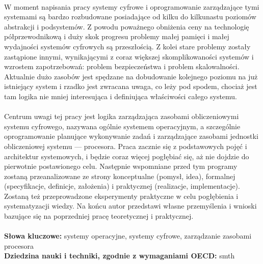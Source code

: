 \documentclass[../main]{subfiles}
\begin{document}
\paragraph{}
W moment napisania  pracy systemy cyfrowe i oprogramowanie zarządzające tymi
systemami są bardzo rozbudowane posiadające od kilku do kilkunastu poziomów abstrakcji i podsystemów. Z
powodu poważnego obniżenia ceny na technologię półprzewodnikową i duży skok progresu problemy małej
pamięci i małej wydajności systemów cyfrowych są przeszłością. Z kolei stare problemy zostały
zastąpione innymi, wynikającymi z coraz większej skomplikowaności systemów i wzrostem zapotrzebowań:
problem bezpieczeństwa i problem skalowalności. Aktualnie dużo zasobów jest spędzane na dobudowanie
kolejnego poziomu na już istniejący system i rzadko jest zwracana uwaga, co leży pod spodem, chociaż
jest tam logika nie mniej interesująca i definiująca właściwości całego systemu.

\paragraph{}
Centrum uwagi  tej pracy jest logika zarządzająca zasobami obliczeniowymi systemu
cyfrowego, nazywana ogólnie systemem operacyjnym, a szczególnie oprogramowanie planujące wykonywanie zadań
i zarządzające zasobami jednostki obliczeniowej systemu — procesora. Praca zacznie się z podstawowych
pojęć i architektur systemowych, i będzie coraz więcej pogłębiać się, aż nie dojdzie do pierwotnie
postawionego celu. Następnie wspomniane przed tym programy zostaną przeanalizowane ze strony
konceptualne (pomysł, idea), formalnej (specyfikacje, definicje, założenia) i praktycznej (realizacje,
implementacje). Zostaną też przeprowadzone eksperymenty praktyczne w celu pogłębienia i systematyzacji
wiedzy. Na końcu autor przedstawi własne przemyślenia i wnioski bazujące się na poprzedniej pracę
teoretycznej i praktycznej.
\\
\\
\textbf{Słowa kluczowe:} systemy operacyjne, systemy cyfrowe, zarządzanie zasobami procesora
\\
\textbf{Dziedzina nauki i techniki, zgodnie z wymaganiami OECD:} smth 
\end{document}

